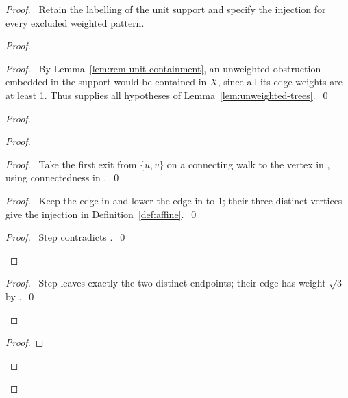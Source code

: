 \begin{proof}
\pfsketch\ Retain the labelling of the unit support and specify the
injection for every excluded weighted pattern.
\begin{proof}
\begin{proof}\pf\ By Lemma~\ref{lem:rem-unit-containment}, an unweighted
obstruction embedded in the support would be contained in $X$, since
all its edge weights are at least 1. Thus  supplies all hypotheses
of Lemma~\ref{lem:unweighted-trees}.~\qed\end{proof}
\begin{proof}
\begin{proof}
\begin{proof}\pf\ Take the first exit from $\{u,v\}$ on a connecting
walk to the vertex in , using connectedness in .~\qed\end{proof}
\begin{proof}\pf\ Keep the edge in  and lower the edge in
 to 1; their three distinct vertices give the injection
in Definition~\ref{def:affine}.~\qed\end{proof}
\qedstep
\begin{proof}\pf\ Step  contradicts .~\qed\end{proof}
\end{proof}
\qedstep
\begin{proof}\pf\ Step  leaves exactly the two distinct
endpoints; their edge has weight $\sqrt3$ by .~\qed\end{proof}
\end{proof}
\begin{proof}

\end{proof}
\end{proof}
\end{proof}
